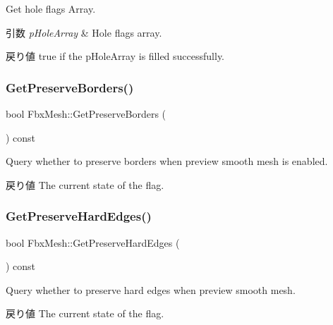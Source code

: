 Get hole flags Array. 
\begin{DoxyParams}{引数}
{\em p\+Hole\+Array} & Hole flags array. \\
\hline
\end{DoxyParams}
\begin{DoxyReturn}{戻り値}
{\ttfamily true} if the p\+Hole\+Array is filled successfully. 
\end{DoxyReturn}
\mbox{\label{class_fbx_mesh_aa2ee9371868bd2cf625f96e31ef44577}} 
\subsubsection{\texorpdfstring{Get\+Preserve\+Borders()}{GetPreserveBorders()}}
{\footnotesize\ttfamily bool Fbx\+Mesh\+::\+Get\+Preserve\+Borders (\begin{DoxyParamCaption}{ }\end{DoxyParamCaption}) const}

Query whether to preserve borders when preview smooth mesh is enabled. \begin{DoxyReturn}{戻り値}
The current state of the flag. 
\end{DoxyReturn}
\mbox{\label{class_fbx_mesh_a93c3cec3811368e69f968b9e84a96a31}} 
\subsubsection{\texorpdfstring{Get\+Preserve\+Hard\+Edges()}{GetPreserveHardEdges()}}
{\footnotesize\ttfamily bool Fbx\+Mesh\+::\+Get\+Preserve\+Hard\+Edges (\begin{DoxyParamCaption}{ }\end{DoxyParamCaption}) const}

Query whether to preserve hard edges when preview smooth mesh. \begin{DoxyReturn}{戻り値}
The current state of the flag. 
\end{DoxyReturn}
\mbox{\label{class_fbx_mesh_a146004786d53607346507bef4bd12101}} 
